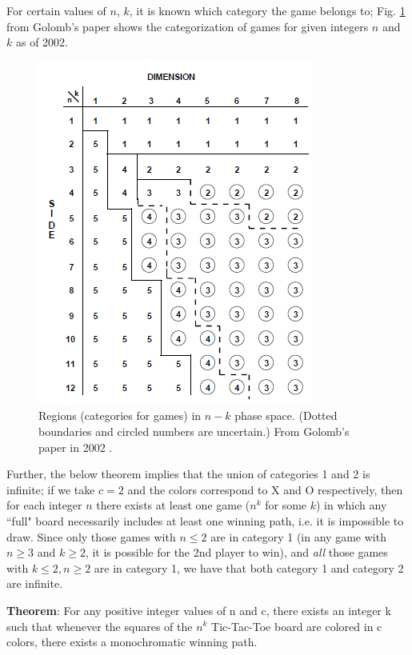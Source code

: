 \documentclass[english, 11pt]{article}
\begin{document}
For certain values of $n$, $k$, it is known which category the game belongs to;
Fig. \ref{fig:golomb_table} from Golomb's paper \cite{golomb} shows the categorization of games for given integers $n$ and $k$ as of 2002.

\begin{figure}[!h]
	\centering
	\includegraphics[scale=1]{./img/golomb.png}
	\caption{Regions (categories for games) in $n - k$ phase space. (Dotted boundaries and circled numbers
		are uncertain.) From Golomb's paper in 2002 \cite{golomb}.} \label{fig:golomb_table}
\end{figure}

Further, the below theorem implies that the union of categories 1 and 2 is infinite; if we take $c=2$ and the colors correspond to X and O respectively, then for each integer $n$ there exists at least one game ($n^k$ for some $k$) in which any ``full" board necessarily includes at least one winning path, i.e. it is impossible to draw.
Since only those games with $n\leq 2$ are in category 1 (in any game with $n \geq 3$ and $k \geq 2$, it is possible for the 2nd player to win), and \emph{all} those games with $k \leq 2, n \geq 2$ are in category 1, we have that both category 1 and category 2 are infinite. 
\begin{displayquote}
	\textbf{Theorem}: 
	For any positive integer values of n and c, there exists an integer k such that
	whenever the squares of the $n^k$ Tic-Tac-Toe board are colored in c colors, there exists a monochromatic winning path.\cite{mathellaneous}
\end{displayquote}
\end{document}
